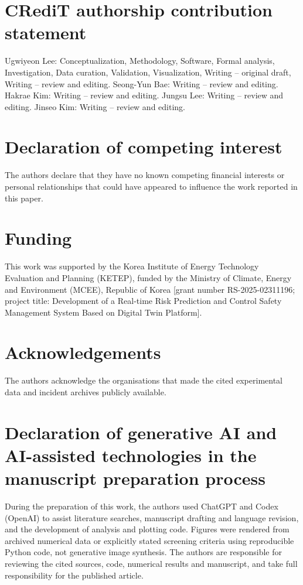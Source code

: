 \documentclass[12pt,a4paper]{article}
\begin{document}
\section*{CRediT authorship contribution statement}
Ugwiyeon Lee: Conceptualization, Methodology, Software, Formal analysis, Investigation,
Data curation, Validation, Visualization, Writing -- original draft, Writing -- review
and editing. Seong-Yun Bae: Writing -- review and editing. Hakrae Kim: Writing -- review
and editing. Jungsu Lee: Writing -- review and editing. Jinseo Kim: Writing -- review
and editing.

\section*{Declaration of competing interest}
The authors declare that they have no known competing financial interests or personal
relationships that could have appeared to influence the work reported in this paper.

\section*{Funding}
This work was supported by the Korea Institute of Energy Technology Evaluation and
Planning (KETEP), funded by the Ministry of Climate, Energy and Environment (MCEE),
Republic of Korea [grant number RS-2025-02311196; project title: Development of a
Real-time Risk Prediction and Control Safety Management System Based on Digital Twin
Platform].

\section*{Acknowledgements}
The authors acknowledge the organisations that made the cited experimental
data and incident archives publicly available.

\section*{Declaration of generative AI and AI-assisted technologies in the
manuscript preparation process}
During the preparation of this work, the authors used ChatGPT and Codex (OpenAI)
to assist literature searches, manuscript drafting and language revision, and the
development of analysis and plotting code. Figures were rendered from archived
numerical data or explicitly stated screening criteria using reproducible Python
code, not generative image synthesis. The authors are responsible for reviewing the
cited sources, code, numerical results and manuscript, and take full responsibility
for the published article.
\end{document}
